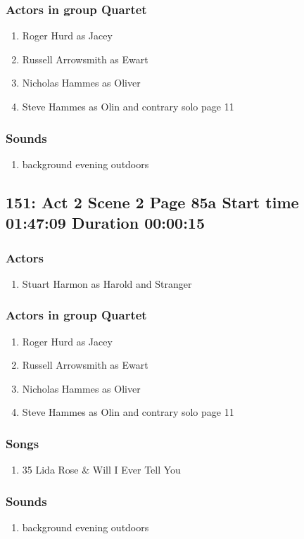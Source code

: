\subsubsection{Actors in group Quartet}
\begin{enumerate}
\item Roger Hurd as Jacey
\item Russell Arrowsmith as Ewart
\item Nicholas Hammes as Oliver
\item Steve Hammes as Olin and contrary solo page 11
\end{enumerate}

\subsubsection{Sounds}
\begin{enumerate}
\item background evening outdoors
\end{enumerate}
\subsection{151: Act 2 Scene 2 Page 85a Start time 01:47:09 Duration 00:00:15}

\subsubsection{Actors}
\begin{enumerate}
\item Stuart Harmon as Harold and Stranger
\end{enumerate}
\subsubsection{Actors in group Quartet}
\begin{enumerate}
\item Roger Hurd as Jacey
\item Russell Arrowsmith as Ewart
\item Nicholas Hammes as Oliver
\item Steve Hammes as Olin and contrary solo page 11
\end{enumerate}

\subsubsection{Songs}
\begin{enumerate}
\item 35 Lida Rose \& Will I Ever Tell You
\end{enumerate}\subsubsection{Sounds}
\begin{enumerate}
\item background evening outdoors
\end{enumerate}
